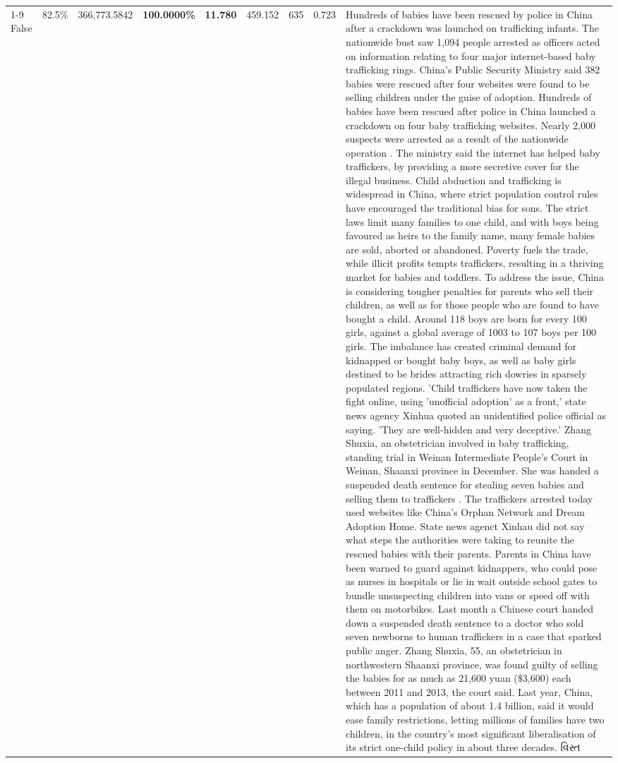 \begin{table}[H]
\begin{tabular}{lllrlllll}
\cline{1-9}
False & 82.5\% & 366,773.5842 & \bfseries \color{red} 100.0000\% & \bfseries \color{red} 11.780 & 459.152 & 635 & 0.723 & Hundreds of babies have been rescued by police in China after a crackdown was launched on trafficking infants. The nationwide bust saw 1,094 people arrested as officers acted on information relating to four major internet-based baby trafficking rings. China's Public Security Ministry said 382 babies were rescued after four websites were found to be selling children under the guise of adoption. Hundreds of babies have been rescued after police in China launched a crackdown on four baby trafficking websites. Nearly 2,000 suspects were arrested as a result of the nationwide operation . The ministry said the internet has helped baby traffickers, by providing a more secretive cover for the illegal business. Child abduction and trafficking is widespread in China, where strict population control rules have encouraged the traditional bias for sons. The strict laws limit many families to one child, and with boys being favoured as heirs to the family name, many female babies are sold, aborted or abandoned. Poverty fuels the trade, while illicit profits tempts traffickers, resulting in a thriving market for babies and toddlers. To address the issue, China is considering tougher penalties for parents who sell their children, as well as for those people who are found to have bought a child. Around 118 boys are born for every 100 girls, against a global average of 1003 to 107 boys per 100 girls. The imbalance has created criminal demand for kidnapped or bought baby boys, as well as baby girls destined to be brides attracting rich dowries in sparsely populated regions. 'Child traffickers have now taken the fight online, using 'unofficial adoption' as a front,' state news agency Xinhua quoted an unidentified police official as saying. 'They are well-hidden and very deceptive.' Zhang Shuxia, an obstetrician involved in baby trafficking, standing trial in Weinan Intermediate People's Court in Weinan, Shaanxi province in December. She was handed a suspended death sentence for stealing seven babies and selling them to traffickers . The traffickers arrested today used websites like China's Orphan Network and Dream Adoption Home. State news agenct Xinhau did not say what steps the authorities were taking to reunite the rescued babies with their parents. Parents in China have been warned to guard against kidnappers, who could pose as nurses in hospitals or lie in wait outside school gates to bundle unsuspecting children into vans or speed off with them on motorbikes. Last month a Chinese court handed down a suspended death sentence to a doctor who sold seven newborns to human traffickers in a case that sparked public anger. Zhang Shuxia, 55, an obstetrician in northwestern Shaanxi province, was found guilty of selling the babies for as much as 21,600 yuan (\$3,600) each between 2011 and 2013, the court said. Last year, China, which has a population of about 1.4 billion, said it would ease family restrictions, letting millions of families have two children, in the country's most significant liberalisation of its strict one-child policy in about three decades. વિસ્ત \\

\end{tabular}
\end{table}
